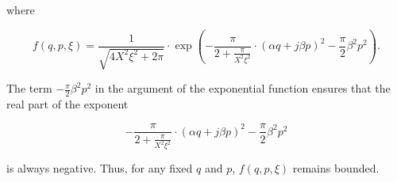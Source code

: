 \documentclass[preprint,12pt]{elsarticle}
\begin{document}
where
\begin{small}
\begin{equation}
 f (q,p,\xi) = \frac{1}{\sqrt{4X^2\xi^2 + 2\pi}} \cdot \exp \left( - \frac{\pi}{2 + \frac{\pi}{X^2\xi^2}} \cdot (\alpha q + j\beta p)^2 - \frac{\pi}{2} \beta^2p^2  \right).
\end{equation}
 \end{small}
The term $- \frac{\pi}{2}\beta^2 p^2 $ in the argument of the exponential function ensures that the real part of the  exponent 
\begin{small}
 $$ - \frac{\pi}{2 + \frac{\pi}{X^2\xi^2}} \cdot (\alpha q + j\beta p)^2 - \frac{\pi}{2}\beta^2 p^2 $$
 \end{small}
 is always negative. Thus, for any fixed $q$ and $p$, $f(q,p,\xi)$ %
remains bounded.
 
 
 
\end{document}
